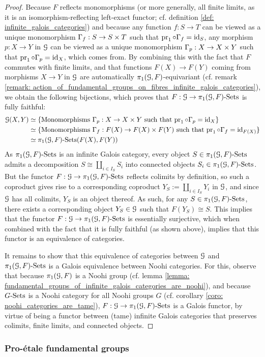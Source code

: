                 \begin{proof}
                    Because $F$ reflects monomorphisms (or more generally, all finite limits, as it is an isomorphism-reflecting left-exact functor; cf. definition \ref{def: infinite_galois_categories}) and because any function $f: S \to T$ can be viewed as a unique monomorphism $\Gamma_f: S \to S \x T$ such that $\operatorname{pr}_1 \circ \Gamma_f = \mathrm{id}_S$, any morphism $p: X \to Y$ in $\mathcal{G}$ can be viewed as a unique monomorphism $\Gamma_p: X \to X \x Y$ such that $\operatorname{pr}_1 \circ \Gamma_p = \mathrm{id}_X$, which comes from. By combining this with the fact that $F$ commutes with finite limits, and that functions $F(X) \to F(Y)$ coming from morphisms $X \to Y$ in $\mathcal{G}$ are automatically $\pi_1(\mathcal{G}, F)$-equivariant (cf. remark \ref{remark: action_of_fundamental_groups_on_fibres_infinite_galois_categories}), we obtain the following bijections, which proves that $F: \mathcal{G} \to \pi_1(\mathcal{G}, F)\text{-}\mathrm{Sets}$ is fully faithful:
                        $$
                            \begin{aligned}
                                \calG(X, Y) & \cong \{\text{Monomorphisms $\Gamma_p: X \to X \x Y$ such that $\pr_1 \circ \Gamma_p = \id_X$}\}
                                \\
                                & \cong \{\text{Monomorphisms $\Gamma_f: F(X) \to F(X) \x F(Y)$ such that $\pr_1 \circ \Gamma_f = \id_{F(X)}$}\} 
                                \\
                                & \cong \pi_1(\calG, F)\-\Sets(F(X), F(Y))
                            \end{aligned}
                        $$
                    As $\pi_1(\mathcal{G}, F)\text{-}\mathrm{Sets}$ is an infinite Galois category, every object $S \in \pi_1(\mathcal{G}, F)\text{-}\mathrm{Sets}$ admits a decomposition $S \cong \coprod_{i \in I_S} S_i$ into connected objects $S_i \in \pi_1(\mathcal{G}, F)\text{-}\mathrm{Sets}$. But the functor $F: \mathcal{G} \to \pi_1(\mathcal{G}, F)\text{-}\mathrm{Sets}$ reflects colimits by definition, so such a coproduct gives rise to a corresponding coproduct $Y_S := \coprod_{i \in I_S} Y_i$ in $\mathcal{G}$, and since $\mathcal{G}$ has all colimits, $Y_S$ is an object thereof. As such, for any $S \in \pi_1(\mathcal{G}, F)\text{-}\mathrm{Sets}$, there exists a corresponding object $Y_S \in \mathcal{G}$ such that $F(Y_S) \cong S$. This implies that the functor $F: \mathcal{G} \to \pi_1(\mathcal{G}, F)\text{-}\mathrm{Sets}$ is essentially surjective, which when combined with the fact that it is fully faithful (as shown above), implies that this functor is an equivalence of categories. 
                    
                    It remains to show that this equivalence of categories between $\mathcal{G}$ and $\pi_1(\mathcal{G}, F)\text{-}\mathrm{Sets}$ is a Galois equivalence between Noohi categories. For this, observe that because $\pi_1(\mathcal{G}, F)$ is a Noohi group (cf. lemma \ref{lemma: fundamental_groups_of_infinite_galois_categories_are_noohi}), and because $G\text{-}\mathrm{Sets}$ is a Noohi category for all Noohi groups $G$ (cf. corollary \ref{coro: noohi_categories_are_tame}), $F: \mathcal{G} \to \pi_1(\mathcal{G}, F)\text{-}\mathrm{Sets}$ is a Galois functor, by virtue of being a functor between (tame) infinite Galois categories that preserves colimits, finite limits, and connected objects.
                \end{proof}
            
        \subsubsection{Pro-\'etale fundamental groups}